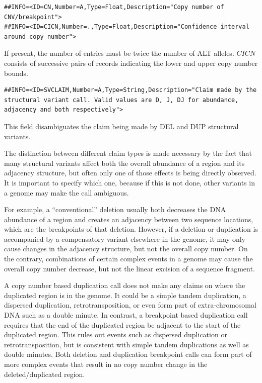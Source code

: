 \documentclass[8pt]{article}
\begin{document}
\footnotesize
\begin{verbatim}
##INFO=<ID=CN,Number=A,Type=Float,Description="Copy number of CNV/breakpoint">
##INFO=<ID=CICN,Number=.,Type=Float,Description="Confidence interval around copy number">
\end{verbatim}
\normalsize

If present, the number of entries must be twice the number of ALT alleles.
$CICN$ consists of successive pairs of records indicating the lower and upper copy number bounds.

\footnotesize
\begin{verbatim}
##INFO=<ID=SVCLAIM,Number=A,Type=String,Description="Claim made by the structural variant call. Valid values are D, J, DJ for abundance, adjacency and both respectively">
\end{verbatim}
\normalsize

This field disambiguates the claim being made by DEL and DUP structural variants.

The distinction between different claim types is made necessary by the fact that many structural variants affect both the overall abundance of a region and its adjacency structure, but often only one of those effects is being directly observed.
It is important to specify which one, because if this is not done, other variants in a genome may make the call ambiguous.

For example, a ``conventional'' deletion usually both decreases the DNA abundance of a region and creates an adjacency between two sequence locations, which are the breakpoints of that deletion.
However, if a deletion or duplication is accompanied by a compensatory variant elsewhere in the genome, it may only cause changes in the adjacency structure, but not the overall copy number.
On the contrary, combinations of certain complex events in a genome may cause the overall copy number decrease, but not the linear excision of a sequence fragment.

A copy number based duplication call does not make any claims on where the duplicated region is in the genome.
It could be a simple tandem duplication, a dispersed duplication, retrotransposition, or even form part of extra-chromosomal DNA such as a double minute.
In contrast, a breakpoint based duplication call requires that the end of the duplicated region be adjacent to the start of the duplicated region.
This rules out events such as dispersed duplication or retrotransposition, but is consistent with simple tandem duplications as well as double minutes.
Both deletion and duplication breakpoint calls can form part of more complex events that result in no copy number change in the deleted/duplicated region.
\end{document}
